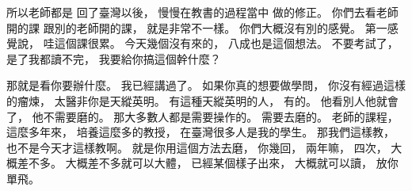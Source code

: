 \hypertarget{w01:cue:2958}{}所以老師都是
\hypertarget{w01:cue:2959}{}回了臺灣以後，
\hypertarget{w01:cue:2960}{}慢慢在教書的過程當中
\hypertarget{w01:cue:2961}{}做的修正。
\hypertarget{w01:cue:2962}{}你們去看老師開的課
\hypertarget{w01:cue:2963}{}跟別的老師開的課，
\hypertarget{w01:cue:2964}{}就是非常不一樣。
\hypertarget{w01:cue:2965}{}你們大概沒有別的感覺。
\hypertarget{w01:cue:2966}{}第一感覺說，
\hypertarget{w01:cue:2967}{}哇這個課很累。
\hypertarget{w01:cue:2968}{}今天幾個沒有來的，
\hypertarget{w01:cue:2969}{}八成也是這個想法。
\hypertarget{w01:cue:2970}{}不要考試了，
\hypertarget{w01:cue:2971}{}是了我都讀不完，
\hypertarget{w01:cue:2972}{}我要給你搞這個幹什麼？

\hypertarget{w01:cue:2973}{}那就是看你要辦什麼。
\hypertarget{w01:cue:2974}{}我已經講過了。
\hypertarget{w01:cue:2975}{}如果你真的想要做學問，
\hypertarget{w01:cue:2976}{}你沒有經過這樣的瘤煉，
\hypertarget{w01:cue:2977}{}太醫非你是天縱英明。
\hypertarget{w01:cue:2978}{}有這種天縱英明的人，
\hypertarget{w01:cue:2979}{}有的。
\hypertarget{w01:cue:2980}{}他看別人他就會了，
\hypertarget{w01:cue:2981}{}他不需要磨的。
\hypertarget{w01:cue:2982}{}那大多數人都是需要操作的。
\hypertarget{w01:cue:2983}{}需要去磨的。
\hypertarget{w01:cue:2984}{}老師的課程，
\hypertarget{w01:cue:2985}{}這麼多年來，
\hypertarget{w01:cue:2986}{}培養這麼多的教授，
\hypertarget{w01:cue:2987}{}在臺灣很多人是我的學生。
\hypertarget{w01:cue:2988}{}那我們這樣教，
\hypertarget{w01:cue:2989}{}也不是今天才這樣教啊。
\hypertarget{w01:cue:2990}{}就是你用這個方法去磨，
\hypertarget{w01:cue:2991}{}你幾回，
\hypertarget{w01:cue:2992}{}兩年嘛，
\hypertarget{w01:cue:2993}{}四次，
\hypertarget{w01:cue:2994}{}大概差不多。
\hypertarget{w01:cue:2995}{}大概差不多就可以大體，
\hypertarget{w01:cue:2996}{}已經某個樣子出來，
\hypertarget{w01:cue:2997}{}大概就可以讀，
\hypertarget{w01:cue:2998}{}放你單飛。

